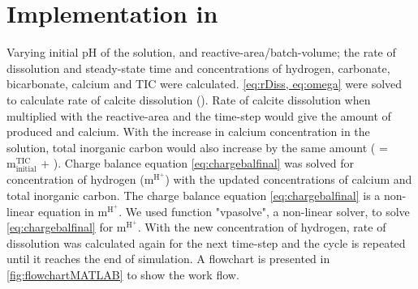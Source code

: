 \section{Implementation in \MATLAB}
Varying initial pH of the solution, and reactive-area/batch-volume; the rate of dissolution and steady-state time and concentrations of hydrogen, carbonate, bicarbonate, calcium and TIC were calculated. \cref{eq:rDiss, eq:omega} were solved to calculate rate of calcite dissolution (). Rate of calcite dissolution when multiplied with the reactive-area and the time-step would give the amount of produced  and calcium. With the increase in calcium concentration in the solution, total inorganic carbon would also increase by the same amount ( = $\mathrm{m_{initial}^{TIC}}$ + ). Charge balance equation \ref{eq:chargebalfinal} was solved for concentration of hydrogen ($\mathrm{m^{H^{+}}}$) with the updated concentrations of calcium and total inorganic carbon. The charge balance equation \ref{eq:chargebalfinal} is a non-linear equation in $\mathrm{m^{H^+}}$. We used \MATLAB function "vpasolve", a non-linear solver, to solve \cref{eq:chargebalfinal} for $\mathrm{m^{H^+}}$. With the new concentration of hydrogen, rate of dissolution was calculated again for the next time-step and the cycle is repeated until it reaches the end of simulation. A flowchart is presented in \cref{fig:flowchartMATLAB} to show the work flow. 


